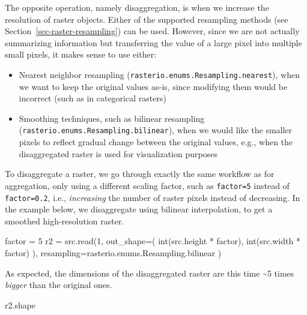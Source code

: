 \documentclass[
  letterpaper,
]{krantz}
\newenvironment{Shaded}{\begin{snugshade}}{\end{snugshade}}
\newcommand{\BuiltInTok}[1]{\textcolor[rgb]{0.00,0.23,0.31}{#1}}
\newcommand{\DecValTok}[1]{\textcolor[rgb]{0.68,0.00,0.00}{#1}}
\newcommand{\NormalTok}[1]{\textcolor[rgb]{0.00,0.23,0.31}{#1}}
\newcommand{\OperatorTok}[1]{\textcolor[rgb]{0.37,0.37,0.37}{#1}}
\providecommand{\tightlist}{%
  \setlength{\itemsep}{0pt}\setlength{\parskip}{0pt}}\usepackage{longtable,booktabs,array}
\begin{document}
The opposite operation, namely disaggregation, is when we increase the
resolution of raster objects. Either of the supported resampling methods
(see Section~\ref{sec-raster-resampling}) can be used. However, since we
are not actually summarizing information but transferring the value of a
large pixel into multiple small pixels, it makes sense to use either:

\begin{itemize}
\tightlist
\item
  Nearest neighbor resampling
  (\texttt{rasterio.enums.Resampling.nearest}), when we want to keep the
  original values as-is, since modifying them would be incorrect (such
  as in categorical rasters)
\item
  Smoothing techniques, such as bilinear resampling
  (\texttt{rasterio.enums.Resampling.bilinear}), when we would like the
  smaller pixels to reflect gradual change between the original values,
  e.g., when the disaggregated raster is used for visualization purposes
\end{itemize}

To disaggregate a raster, we go through exactly the same workflow as for
aggregation, only using a different scaling factor, such as
\texttt{factor=5} instead of \texttt{factor=0.2}, i.e.,
\emph{increasing} the number of raster pixels instead of decreasing. In
the example below, we disaggregate using bilinear interpolation, to get
a smoothed high-resolution raster.

\begin{Shaded}
\begin{Highlighting}[]
\NormalTok{factor }\OperatorTok{=} \DecValTok{5}
\NormalTok{r2 }\OperatorTok{=}\NormalTok{ src.read(}\DecValTok{1}\NormalTok{,}
\NormalTok{    out\_shape}\OperatorTok{=}\NormalTok{(}
        \BuiltInTok{int}\NormalTok{(src.height }\OperatorTok{*}\NormalTok{ factor),}
        \BuiltInTok{int}\NormalTok{(src.width }\OperatorTok{*}\NormalTok{ factor)}
\NormalTok{        ),}
\NormalTok{    resampling}\OperatorTok{=}\NormalTok{rasterio.enums.Resampling.bilinear}
\NormalTok{)}
\end{Highlighting}
\end{Shaded}

As expected, the dimensions of the disaggregated raster are this time
\textasciitilde5 times \emph{bigger} than the original ones.

\begin{Shaded}
\begin{Highlighting}[]
\NormalTok{r2.shape}
\end{Highlighting}
\end{Shaded}
\end{document}
